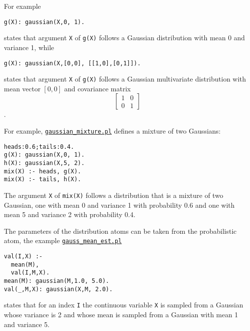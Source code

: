 For example
\begin{verbatim}
g(X): gaussian(X,0, 1).
\end{verbatim}
states that argument \verb|X| of \verb|g(X)| follows a Gaussian 
distribution with mean 0 and variance 1, while
\begin{verbatim}
g(X): gaussian(X,[0,0], [[1,0],[0,1]]).
\end{verbatim}
states that argument \verb|X| of \verb|g(X)| follows a Gaussian 
multivariate distribution with mean vector $[0,0]$ and covariance matrix
$$\left[\begin{array}{rr}
1&0\\
0&1
\end{array}\right]$$.



For example, \href{http://cplint.eu/example/inference/gaussian_mixture.pl}{\texttt{gaussian\_mixture.pl}} defines a mixture of two Gaussians:
\begin{verbatim}
heads:0.6;tails:0.4.
g(X): gaussian(X,0, 1).
h(X): gaussian(X,5, 2).
mix(X) :- heads, g(X).
mix(X) :- tails, h(X).
\end{verbatim}
The argument \verb|X| of
\verb|mix(X)| follows a distribution that is a mixture of two Gaussian,
one with mean 0 and variance 1 with probability 0.6 and one with 
mean 5 and variance 2 with probability 0.4.

The parameters of the distribution atoms can be taken from the probabilistic
atom, the example \href{http://cplint.eu/example/inference/gauss_mean_est.pl}{\texttt{gauss\_mean\_est.pl}}
\begin{verbatim}
val(I,X) :-
  mean(M),
  val(I,M,X).
mean(M): gaussian(M,1.0, 5.0).
val(_,M,X): gaussian(X,M, 2.0).
\end{verbatim}
states that for an index \verb|I| the continuous variable \verb|X| is 
sampled from a Gaussian whose variance is 2 and whose mean is sampled from a Gaussian with mean 1 and
variance 5.

